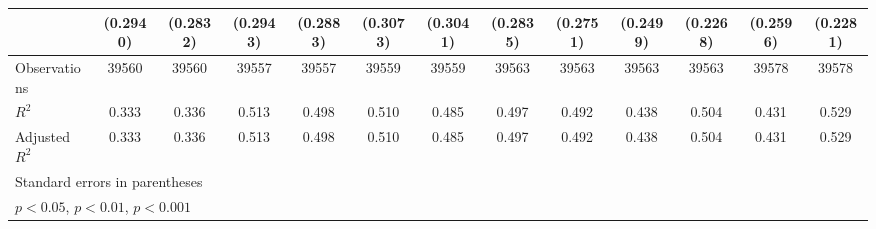 {\begin{tabular}{l*{12}{c}}
                    &    (0.2940)         &    (0.2832)         &    (0.2943)         &    (0.2883)         &    (0.3073)         &    (0.3041)         &    (0.2835)         &    (0.2751)         &    (0.2499)         &    (0.2268)         &    (0.2596)         &    (0.2281)         \\
\midrule
Observations        &       39560         &       39560         &       39557         &       39557         &       39559         &       39559         &       39563         &       39563         &       39563         &       39563         &       39578         &       39578         \\
\(R^{2}\)           &       0.333         &       0.336         &       0.513         &       0.498         &       0.510         &       0.485         &       0.497         &       0.492         &       0.438         &       0.504         &       0.431         &       0.529         \\
Adjusted \(R^{2}\)  &       0.333         &       0.336         &       0.513         &       0.498         &       0.510         &       0.485         &       0.497         &       0.492         &       0.438         &       0.504         &       0.431         &       0.529         \\
\bottomrule
\multicolumn{13}{l}{\footnotesize Standard errors in parentheses}\\
\multicolumn{13}{l}{\footnotesize \sym{*} \(p<0.05\), \sym{**} \(p<0.01\), \sym{***} \(p<0.001\)}\\
\end{tabular}
}
